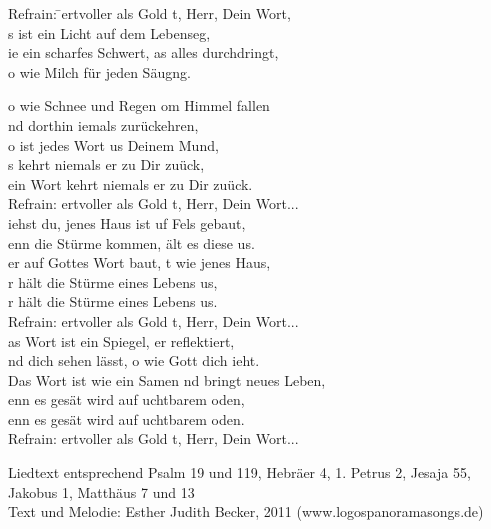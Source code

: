 
\begin{tabbing}
Refrain: \=	ertvoller als Gold t, Herr, Dein Wort,\\
	\>	s ist ein Licht auf dem Lebenseg,\\
	\>	ie ein scharfes Schwert, as alles durchdringt,\\
	\>	o wie Milch für jeden Säugng.
\end{tabbing} 

o wie Schnee und Regen om Himmel fallen\\
nd dorthin iemals zurückehren,\\
o ist jedes Wort us Deinem Mund,\\
s kehrt niemals er zu Dir zuück,\\
ein Wort kehrt niemals er zu Dir zuück. \\

Refrain:	ertvoller als Gold t, Herr, Dein Wort...\\

iehst du, jenes Haus ist uf Fels gebaut,\\
enn die Stürme kommen, ält es diese us.\\
er auf Gottes Wort baut, t wie jenes Haus,\\
r hält die Stürme eines Lebens us,\\
r hält die Stürme eines Lebens us. \\

Refrain:	ertvoller als Gold t, Herr, Dein Wort...\\


as Wort ist ein Spiegel, er reflektiert,\\
nd dich sehen lässt, o wie Gott dich ieht.\\
Das Wort ist wie ein Samen nd bringt neues Leben,\\
enn es gesät wird auf uchtbarem oden,\\
enn es gesät wird auf uchtbarem oden.\\

Refrain:	ertvoller als Gold t, Herr, Dein Wort...\\

\begin{footnotesize}
Liedtext entsprechend Psalm 19 und 119, Hebräer 4, 1. Petrus 2, Jesaja 55, Jakobus 1, Matthäus 7 und 13\\
Text und Melodie: Esther Judith Becker, 2011 (www.logospanoramasongs.de)
\end{footnotesize}